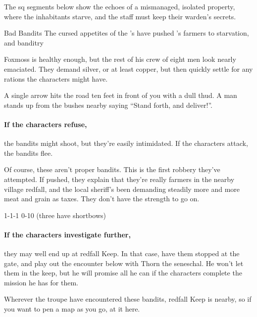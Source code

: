 The \gls{sq} \glspl{segment} below show the echoes of a mismanaged, isolated property, where the inhabitants starve, and the staff must keep their \gls{warden}'s secrets.

{Bad Bandits}%
{The cursed appetites of the 's  have pushed 's farmers to starvation, and banditry}%

Foxmoss is healthy enough, but the rest of his crew of eight men look nearly emaciated.
They demand silver, or at least copper, but then quickly settle for any rations the characters might have.

\begin{boxtext}
  A single arrow hits the road ten feet in front of you with a dull thud.
  A man stands up from the bushes nearby saying ``Stand forth, and deliver!''.
\end{boxtext}

\paragraph{If the characters refuse,}
the bandits might shoot, but they're easily intimidated.
If the characters attack, the bandits flee.

Of course, these aren't proper bandits.
This is the first robbery they've attempted.
If pushed, they explain that they're really farmers in the nearby village \gls{redfall}, and the local sheriff's been demanding steadily more and more meat and grain as taxes.
They don't have the strength to go on.

%
  {{1}{-1}{-1}}%
  {{0}{-1}{0}}%
  {%
    \Dagger
  }%
  {}%
  {(three have shortbows)}%
  {}%

\paragraph{If the characters investigate further,}
they may well end up at \gls{redfall} Keep.
In that case, have them stopped at the gate, and play out the encounter below with Thorn the \gls{seneschal}.
He won't let them in the keep, but he will promise all he can if the characters complete the mission he has for them.

Wherever the troupe have encountered these bandits, \gls{redfall} Keep is nearby, so if you want to pen a map as you go, at it here.

